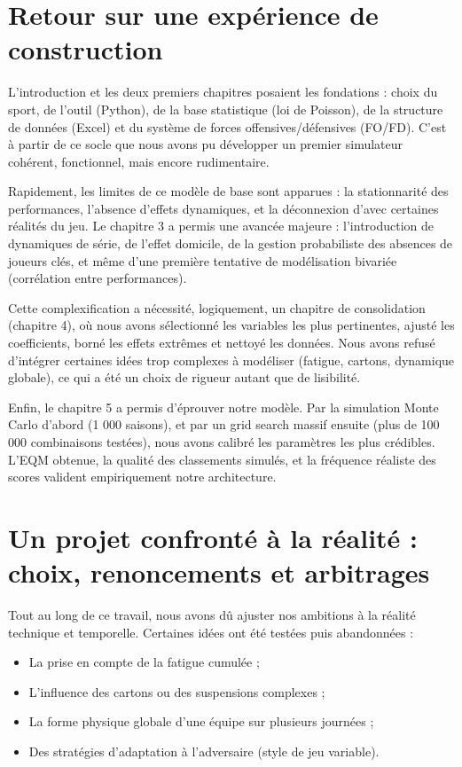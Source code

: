 \documentclass[12pt]{report}
\begin{document}
\section{Retour sur une expérience de construction}

L’introduction et les deux premiers chapitres posaient les fondations : choix du sport, de l’outil (Python), de la base statistique (loi de Poisson), de la structure de données (Excel) et du système de forces offensives/défensives (FO/FD). C’est à partir de ce socle que nous avons pu développer un premier simulateur cohérent, fonctionnel, mais encore rudimentaire.

Rapidement, les limites de ce modèle de base sont apparues : la stationnarité des performances, l’absence d’effets dynamiques, et la déconnexion d’avec certaines réalités du jeu. Le chapitre 3 a permis une avancée majeure : l’introduction de dynamiques de série, de l’effet domicile, de la gestion probabiliste des absences de joueurs clés, et même d’une première tentative de modélisation bivariée (corrélation entre performances).

Cette complexification a nécessité, logiquement, un chapitre de consolidation (chapitre 4), où nous avons sélectionné les variables les plus pertinentes, ajusté les coefficients, borné les effets extrêmes et nettoyé les données. Nous avons refusé d’intégrer certaines idées trop complexes à modéliser (fatigue, cartons, dynamique globale), ce qui a été un choix de rigueur autant que de lisibilité.

Enfin, le chapitre 5 a permis d’éprouver notre modèle. Par la simulation Monte Carlo d’abord (1 000 saisons), et par un grid search massif ensuite (plus de 100 000 combinaisons testées), nous avons calibré les paramètres les plus crédibles. L’EQM obtenue, la qualité des classements simulés, et la fréquence réaliste des scores valident empiriquement notre architecture.

\section{Un projet confronté à la réalité : choix, renoncements et arbitrages}

Tout au long de ce travail, nous avons dû ajuster nos ambitions à la réalité technique et temporelle. Certaines idées ont été testées puis abandonnées :
\\
\begin{itemize}
  \item La prise en compte de la fatigue cumulée ;
  \item L’influence des cartons ou des suspensions complexes ;
  \item La forme physique globale d’une équipe sur plusieurs journées ;
  \item Des stratégies d’adaptation à l’adversaire (style de jeu variable).\\
\end{itemize}
\end{document}
